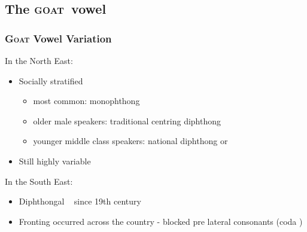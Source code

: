 \documentclass[
xcolor=table,
PHONON=true]
{beamer}
\makeatletter
\newcommand{\ipa}[1]{\textipa{/#1/}}
\newcommand{\oh}{\textipa{[@U]}}
\newcommand{\scs}{\textsc}
\newcommand{\goat}{\textsc{goat}~}
\makeatother
\begin{document}
	\subsection{The \goat vowel}
	\begin{frame}
		\frametitle{\scs{Goat} Vowel Variation}
		In the North East:
		\begin{itemize}
			\item Socially stratified \citep{Watt1999}
			\begin{itemize}
				\item most common: monophthong 
				\item older male speakers: traditional centring diphthong \textipa{[U@]}
				\item younger middle class speakers: national diphthong \textipa{[oU]} or \oh 
			\end{itemize}
			\item Still highly variable \citep{Warburton2021}
		\end{itemize}
		\pause
		In the South East:
		\begin{itemize}
			\item Diphthongal \oh~ since 19th century \citep{Sampson1985}
			\item Fronting occurred across the country \citep[and others]{Kerswill1996,Baranowski2017} - blocked pre lateral consonants (coda \ipa{l})
		\end{itemize}
	\end{frame}
	
\end{document}
